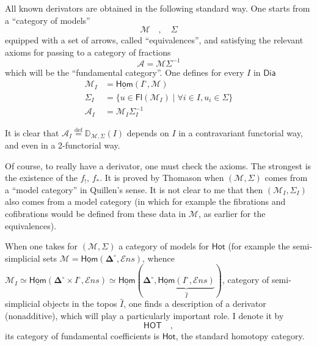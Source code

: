 \documentclass[11pt]{article}
\newcommand{\printedpage}[1]{\marginpar{\footnotesize p.~#1}}
\newcommand{\msp}[1]{\marginpar{\footnotesize [#1]}}
\newcommand{\DD}{\mathbb{D}}
\newcommand{\uHom}{\underline{\mathsf{Hom}}}
\newcommand{\Dia}{\mathsf{Dia}}
\newcommand{\Ens}{\mathcal{E}ns}
\newcommand{\bDelta}{\boldsymbol{\Delta}}
\newcommand{\defeq}{\overset{\text{def}}{=}}
\begin{document}
All known derivators are obtained in the following standard way. One starts from a ``category of models''
\[
\mathcal{M} \quad , \quad \Sigma
\]
equipped with a set of arrows, called ``equivalences'', and satisfying the relevant axioms for passing to a category of fractions
\[
\mathcal{A} = \mathcal{M}\Sigma^{-1}
\]
which will be the ``fundamental category''. One defines for every $I$ in $\Dia$
\[
\begin{aligned}
\mathcal{M}_I &= \uHom(I^\circ,\mathcal{M}) \\
\Sigma_I &= \{u \in \mathsf{Fl}(\mathcal{M}_I) \mid \forall i \in I, u_i \in \Sigma\} \\
\mathcal{A}_I &= \mathcal{M}_I\Sigma_I^{-1}
\end{aligned}
\]

\noindent\msp{page 13}It is clear that $\mathcal{A}_I \defeq \DD_{\mathcal{M},\Sigma}(I)$ depends on $I$ in a contravariant functorial way, and even in a 2-functorial way.

Of course, to really have a derivator, one must check the axioms. The strongest is the existence of the $f_!$, $f_*$. It is proved by Thomason when $(\mathcal{M},\Sigma)$ comes from a ``model category'' in Quillen's sense. It is not clear to me that then $(\mathcal{M}_I,\Sigma_I)$ also comes from a model category (in which for example the fibrations \printedpage{11}%
and cofibrations would be defined from these data in $\mathcal{M}$, as earlier for the equivalences).

When one takes for $(\mathcal{M},\Sigma)$ a category of models for $\mathsf{Hot}$ (for example the semi-simplicial sets $\mathcal{M} = \uHom(\bDelta^\circ,\Ens)$, whence $\mathcal{M}_I \simeq \uHom(\bDelta^\circ \times I^\circ,\Ens) \simeq \uHom(\bDelta^\circ,\underbrace{\uHom(I^\circ,\Ens)}_{\widehat{I}})$, category of semi-simplicial objects in the topos $\widehat{I}$, one finds a description of a derivator (nonadditive), which will play a particularly important role. I denote it by %
\[
\mathsf{HOT} \quad ,
\]
its category of fundamental coefficients is $\mathsf{Hot}$, the standard homotopy category.
\end{document}
